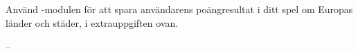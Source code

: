 \Subtask
Använd -modulen för att spara användarens poängresultat i ditt spel om Europas länder och städer, i extrauppgiften ovan.

\begin{figure}
  \label{disk-access-code}
\end{figure}
\SOLUTION

\TaskSolved --

\QUESTEND



%
%
%
%
%
%
%
%
%
%
%
%
%
%
%
%
%
%
%
%
%
%
%
%
%
%

